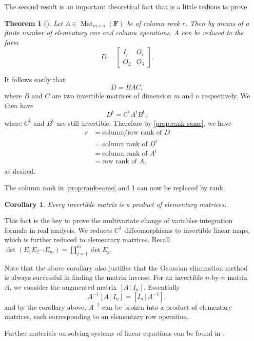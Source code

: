 \documentclass[11pt]{article}
\numberwithin{equation}{section}
\theoremstyle{plain-star}
\newtheorem{thm}[equation]{Theorem}
\newtheorem{cor}[equation]{Corollary}
\theoremstyle{definition-star}
\theoremstyle{remark-star}
\theoremstyle{plain-star}
\newcommand{\F}{\mathbf{F}}
\newcommand{\Mat}{\operatorname{Mat}}
\newcommand{\trp}{\mathrm{t}}
\begin{document}
The second result is an important theoretical fact that is a little tedious to prove.
\begin{thm}[{\cite[Theorem 3.6]{friedberg2003linear}}]\label{thm:reduced-form}
    Let $A \in \Mat_{m\times n}(\F)$ be of column rank $r$. Then by means of a finite number of elementary row and column operations, $A$ can be reduced to the form \[
        D = \begin{bmatrix}
            I_r & O_1 \\
            O_2 & O_3
        \end{bmatrix}.
    \]
\end{thm}
It follows easily that \[D = BAC,\] where $B$ and $C$ are two invertible matrices of dimension $m$ and $n$ respectively. We then have \[
    D^\trp = C^\trp A^\trp B^\trp,
\] where $C^\trp$ and $B^\trp$ are still invertible. Therefore by \cref{prop:rank-same}, we have \begin{align*}
    r & = \text{column/row rank of } D \\
    & = \text{column rank of } D^\trp \\
    & = \text{column rank of } A^\trp \\
    & = \text{row rank of } A,
\end{align*}
as desired.

The column rank in \cref{prop:rank-same} and \cref{thm:reduced-form} can now be replaced by rank.

\begin{cor}
    Every invertible matrix is a product of elementary matrices.
\end{cor}
This fact is the key to prove the multivariate change of variables integration formula in real analysis. We reduces $C^1$ diffeomorphisms to invertible linear maps, which is further reduced to elementary matrices. Recall $\det (E_1 E_2 \dotsm E_m) = \prod_{j=1}^m \det E_j$.

Note that the above corollary also justifies that the Gaussian elimination method is always successful in finding the matrix inverse. For an invertible $n$-by-$n$ matrix $A$, we consider the augmented matrix $[A \,\vert\, I_n]$. Essentially \[
    A^{-1}[A \,\vert\, I_n] = [I_n \,\vert\, A^{-1}],
\] and by the corollary above, $A^{-1}$ can be broken into a product of elementary matrices, each corresponding to an elementary row operation.

Further materials on solving systems of linear equations can be found in \cite[Sections 3.3 and 3.4]{friedberg2003linear}.
\end{document}
